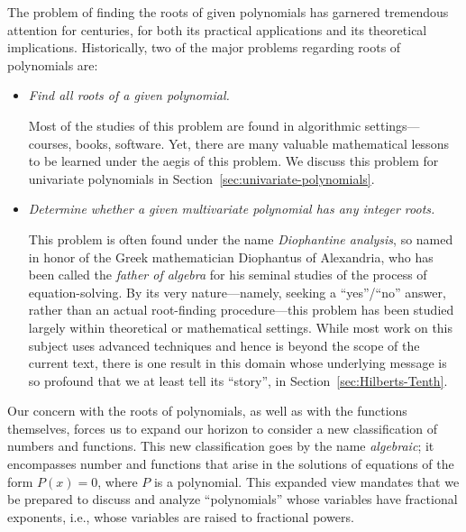 The problem of finding the roots of given polynomials has garnered tremendous attention for centuries, for both its practical applications and its theoretical implications.  Historically, two of the major problems regarding roots of polynomials are:
\begin{itemize}
\item
{\em Find all roots of a given polynomial.}

\smallskip

Most of the studies of this problem are found in algorithmic settings---courses, books, software.  Yet, there are many valuable mathematical lessons to be learned under the aegis of this problem.  We discuss this problem for univariate polynomials in Section~\ref{sec:univariate-polynomials}.

\medskip\item
{\em Determine whether a given multivariate polynomial has any integer roots.}

\smallskip

 
 
This problem is often found under the name {\it Diophantine analysis}, so named in honor of the Greek mathematician Diophantus of Alexandria, who has been called the {\em father of algebra} for his seminal studies of the process of equation-solving.  By its very nature---namely, seeking a ``{\sc yes}''/``{\sc no}'' answer, rather than an actual root-finding procedure---this problem has been studied largely within theoretical or mathematical settings.  While most work on this subject uses advanced techniques and hence is beyond the scope of the current text, there is one result in this domain whose underlying message is so profound that we at least tell its ``story'', in Section~\ref{sec:Hilberts-Tenth}.
\end{itemize}
 

\bigskip

  
Our concern with the roots of polynomials, as well as with the functions themselves, forces us to expand our horizon to consider a new classification of numbers and functions.  This new classification goes by the name {\it algebraic}; it encompasses number and functions that arise in the solutions of equations of the form $P(x) = 0$, where $P$ is a polynomial.  This expanded view mandates that we be prepared to discuss and analyze ``polynomials'' whose variables have fractional exponents, i.e., whose variables are raised to fractional powers.


